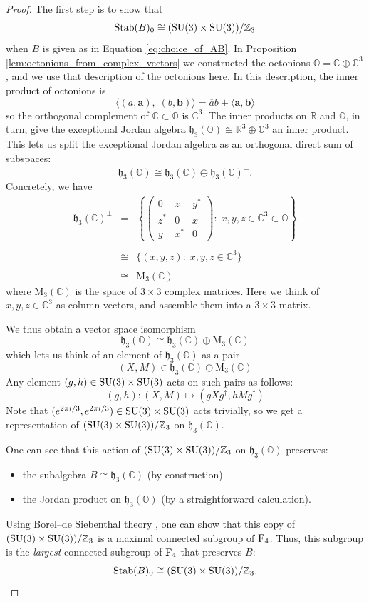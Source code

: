 \documentclass{article}
\theoremstyle{plain}
\theoremstyle{remark}
\theoremstyle{definition}
\newcommand{\maps}{\colon}    %
\newcommand{\R}{{\mathbb R}}  %
\newcommand{\C}{{\mathbb C}}  %
\newcommand{\Z}{{\mathbb Z}}  %
\renewcommand{\O}{{\mathbb O}}  %
\newcommand{\SU}{{\rm SU}}    %
\newcommand{\F}{{\rm F}}       %
\newcommand{\Stab}{\mathrm{Stab}} %
\newcommand{\M}{\mathrm{M}}   %
\newcommand{\h}{\mathfrak{h}}  %
\begin{document}
\begin{proof}
The first step is to show that
\[   \Stab(B)_0 \cong (\SU(3) \times \SU(3))/\Z_3 \]
when $B$ is given as in Equation \eqref{eq:choice_of_AB}.
In Proposition \ref{lem:octonions_from_complex_vectors} we constructed the octonions $\O = \C \oplus \C^3$, and we use that description of the octonions here.   In this description, the inner product of octonions is
\[   \langle (a,\mathbf{a}), \; (b, \mathbf{b}) \rangle = \overline{a} b + \langle \mathbf{a}, \mathbf{b} \rangle \]
so the orthogonal complement of $\C \subset \O$ is $\C^3$.
The inner products on $\R$ and $\O$, in turn, give the exceptional Jordan algebra $\h_3(\O) \cong \R^3 \oplus \O^3$ an inner product.  This lets us split the exceptional Jordan algebra as an orthogonal direct sum of subspaces:
\[   \h_3(\O) \cong \h_3(\C) \oplus \h_3(\C)^\perp .\]
Concretely, we have
\[
\begin{array}{ccl}
\h_3(\C)^\perp 
&=& \left\{  \left( \begin{array}{ccc}  
                         0  &  z  & y^*    \\  
                         z^*       & 0 & x      \\ 
                         y       & x^*   & 0   
\end{array} \right) : \;  x,y,z \in \C^3 \subset \O \right\}  \\ \\
&\cong& \{(x,y,z) : \; x,y,z \in \C^3 \}  \\ \\
&\cong& \M_3(\C) 
\end{array}
\]
where $\M_3(\C)$ is the space of $3 \times 3$ complex matrices.  Here we think of $x,y,z \in \C^3$ as column vectors, and assemble them into a $3 \times 3$ matrix.

We thus obtain a vector space isomorphism
\[  \h_3(\O) \cong  \h_3(\C) \oplus \M_3(\C) 
 \]
which lets us think of an element of $\h_3(\O)$ as a pair
\[    (X,M) \in  \h_3(\C) \oplus \M_3(\C)  \]
Any element $(g,h) \in \SU(3) \times \SU(3)$ acts on such pairs as follows:
\[    (g,h) \maps (X,M) \mapsto (gXg^\dagger, hMg^\dagger ) \]
Note that $(e^{2\pi i/3}, e^{2\pi i/3}) \in \SU(3) \times \SU(3)$ acts trivially, so we get a representation of $(\SU(3) \times \SU(3))/\Z_3$ on $\h_3(\O)$.  

One can see that this action of $(\SU(3) \times \SU(3))/\Z_3$ on $\h_3(\O)$ preserves:
\begin{itemize}
\item the subalgebra $B \cong \h_3(\C)$ (by construction)
\item the Jordan product on $\h_3(\O)$ (by a straightforward calculation).
\end{itemize}
Using Borel--de Siebenthal theory \cite{BS,Dynkin,Yokota}, one can show that this copy of $(\SU(3) \times \SU(3))/\Z_3$ is a maximal connected subgroup of $\F_4$.  Thus, this subgroup is the \emph{largest} connected subgroup of $\F_4$ that preserves $B$:
\[   \Stab(B)_0 \cong (\SU(3) \times \SU(3))/\Z_3 .\]


\end{proof}
\end{document}
